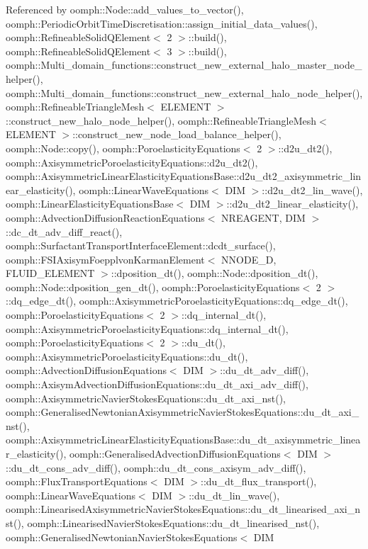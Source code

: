 Referenced by oomph\+::\+Node\+::add\+\_\+values\+\_\+to\+\_\+vector(), oomph\+::\+Periodic\+Orbit\+Time\+Discretisation\+::assign\+\_\+initial\+\_\+data\+\_\+values(), oomph\+::\+Refineable\+Solid\+Q\+Element$<$ 2 $>$\+::build(), oomph\+::\+Refineable\+Solid\+Q\+Element$<$ 3 $>$\+::build(), oomph\+::\+Multi\+\_\+domain\+\_\+functions\+::construct\+\_\+new\+\_\+external\+\_\+halo\+\_\+master\+\_\+node\+\_\+helper(), oomph\+::\+Multi\+\_\+domain\+\_\+functions\+::construct\+\_\+new\+\_\+external\+\_\+halo\+\_\+node\+\_\+helper(), oomph\+::\+Refineable\+Triangle\+Mesh$<$ E\+L\+E\+M\+E\+N\+T $>$\+::construct\+\_\+new\+\_\+halo\+\_\+node\+\_\+helper(), oomph\+::\+Refineable\+Triangle\+Mesh$<$ E\+L\+E\+M\+E\+N\+T $>$\+::construct\+\_\+new\+\_\+node\+\_\+load\+\_\+balance\+\_\+helper(), oomph\+::\+Node\+::copy(), oomph\+::\+Poroelasticity\+Equations$<$ 2 $>$\+::d2u\+\_\+dt2(), oomph\+::\+Axisymmetric\+Poroelasticity\+Equations\+::d2u\+\_\+dt2(), oomph\+::\+Axisymmetric\+Linear\+Elasticity\+Equations\+Base\+::d2u\+\_\+dt2\+\_\+axisymmetric\+\_\+linear\+\_\+elasticity(), oomph\+::\+Linear\+Wave\+Equations$<$ D\+I\+M $>$\+::d2u\+\_\+dt2\+\_\+lin\+\_\+wave(), oomph\+::\+Linear\+Elasticity\+Equations\+Base$<$ D\+I\+M $>$\+::d2u\+\_\+dt2\+\_\+linear\+\_\+elasticity(), oomph\+::\+Advection\+Diffusion\+Reaction\+Equations$<$ N\+R\+E\+A\+G\+E\+N\+T, D\+I\+M $>$\+::dc\+\_\+dt\+\_\+adv\+\_\+diff\+\_\+react(), oomph\+::\+Surfactant\+Transport\+Interface\+Element\+::dcdt\+\_\+surface(), oomph\+::\+F\+S\+I\+Axisym\+Foepplvon\+Karman\+Element$<$ N\+N\+O\+D\+E\+\_\+D, F\+L\+U\+I\+D\+\_\+\+E\+L\+E\+M\+E\+N\+T $>$\+::dposition\+\_\+dt(), oomph\+::\+Node\+::dposition\+\_\+dt(), oomph\+::\+Node\+::dposition\+\_\+gen\+\_\+dt(), oomph\+::\+Poroelasticity\+Equations$<$ 2 $>$\+::dq\+\_\+edge\+\_\+dt(), oomph\+::\+Axisymmetric\+Poroelasticity\+Equations\+::dq\+\_\+edge\+\_\+dt(), oomph\+::\+Poroelasticity\+Equations$<$ 2 $>$\+::dq\+\_\+internal\+\_\+dt(), oomph\+::\+Axisymmetric\+Poroelasticity\+Equations\+::dq\+\_\+internal\+\_\+dt(), oomph\+::\+Poroelasticity\+Equations$<$ 2 $>$\+::du\+\_\+dt(), oomph\+::\+Axisymmetric\+Poroelasticity\+Equations\+::du\+\_\+dt(), oomph\+::\+Advection\+Diffusion\+Equations$<$ D\+I\+M $>$\+::du\+\_\+dt\+\_\+adv\+\_\+diff(), oomph\+::\+Axisym\+Advection\+Diffusion\+Equations\+::du\+\_\+dt\+\_\+axi\+\_\+adv\+\_\+diff(), oomph\+::\+Axisymmetric\+Navier\+Stokes\+Equations\+::du\+\_\+dt\+\_\+axi\+\_\+nst(), oomph\+::\+Generalised\+Newtonian\+Axisymmetric\+Navier\+Stokes\+Equations\+::du\+\_\+dt\+\_\+axi\+\_\+nst(), oomph\+::\+Axisymmetric\+Linear\+Elasticity\+Equations\+Base\+::du\+\_\+dt\+\_\+axisymmetric\+\_\+linear\+\_\+elasticity(), oomph\+::\+Generalised\+Advection\+Diffusion\+Equations$<$ D\+I\+M $>$\+::du\+\_\+dt\+\_\+cons\+\_\+adv\+\_\+diff(), oomph\+::du\+\_\+dt\+\_\+cons\+\_\+axisym\+\_\+adv\+\_\+diff(), oomph\+::\+Flux\+Transport\+Equations$<$ D\+I\+M $>$\+::du\+\_\+dt\+\_\+flux\+\_\+transport(), oomph\+::\+Linear\+Wave\+Equations$<$ D\+I\+M $>$\+::du\+\_\+dt\+\_\+lin\+\_\+wave(), oomph\+::\+Linearised\+Axisymmetric\+Navier\+Stokes\+Equations\+::du\+\_\+dt\+\_\+linearised\+\_\+axi\+\_\+nst(), oomph\+::\+Linearised\+Navier\+Stokes\+Equations\+::du\+\_\+dt\+\_\+linearised\+\_\+nst(), oomph\+::\+Generalised\+Newtonian\+Navier\+Stokes\+Equations$<$ D\+I\+M 